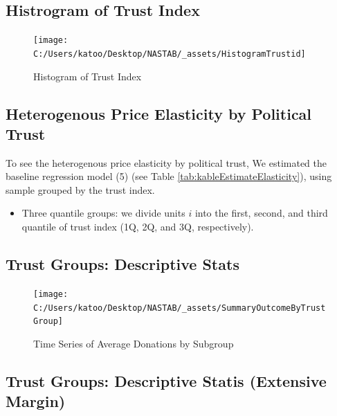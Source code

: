 \documentclass[ review  , 3p ]{elsarticle}
\providecommand{\tightlist}{%
  \setlength{\itemsep}{0pt}\setlength{\parskip}{0pt}}
\begin{document}
  \hypertarget{histrogram-of-trust-index}{%
  \subsection{Histrogram of Trust Index}\label{histrogram-of-trust-index}}

  \begin{figure}

  {\centering \texttt{[image: C:/Users/katoo/Desktop/NASTAB/\_assets/HistogramTrustid]} 

  }

  \caption{Histogram of Trust Index}\label{fig:unnamed-chunk-6}
  \end{figure}

  \hypertarget{heterogenous-price-elasticity-by-political-trust}{%
  \subsection{Heterogenous Price Elasticity by Political Trust}\label{heterogenous-price-elasticity-by-political-trust}}

  To see the heterogenous price elasticity by political trust,
  We estimated the baseline regression model (5) (see Table \ref{tab:kableEstimateElasticity}),
  using sample grouped by the trust index.

  \begin{itemize}
  \tightlist
  \item
    Three quantile groups: we divide units \(i\) into the first, second, and third quantile of trust index (1Q, 2Q, and 3Q, respectively).
  \end{itemize}

  \hypertarget{trust-groups-descriptive-stats}{%
  \subsection{Trust Groups: Descriptive Stats}\label{trust-groups-descriptive-stats}}

  \begin{figure}

  {\centering \texttt{[image: C:/Users/katoo/Desktop/NASTAB/\_assets/SummaryOutcomeByTrustGroup]} 

  }

  \caption{Time Series of Average Donations by Subgroup}\label{fig:unnamed-chunk-7}
  \end{figure}

  \hypertarget{trust-groups-descriptive-statis-extensive-margin}{%
  \subsection{Trust Groups: Descriptive Statis (Extensive Margin)}\label{trust-groups-descriptive-statis-extensive-margin}}
\end{document}
